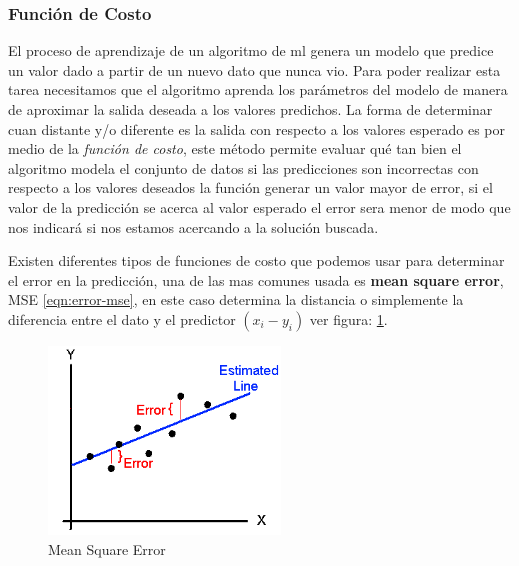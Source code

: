\subsubsection{Función de Costo}\label{sub:funcion_costo}

El proceso de aprendizaje de un algoritmo de \ac{ml} genera un  modelo que predice un valor dado a partir de un nuevo dato que nunca vio. Para poder realizar esta tarea necesitamos que el algoritmo aprenda los parámetros del modelo de manera de aproximar la salida deseada a los valores predichos. La forma de determinar cuan distante y/o diferente es la salida con respecto a los valores esperado es por medio de la \textit{función de costo}, este método permite evaluar qué tan bien el algoritmo modela el conjunto de datos si las predicciones son incorrectas con respecto a los valores deseados la función generar un valor mayor de error, si el valor de la predicción se acerca al valor esperado el error sera menor de modo que nos indicará si nos estamos acercando a la solución buscada.

Existen diferentes tipos de funciones de costo que podemos usar para determinar el error en la predicción, una de las mas comunes usada es \textbf{mean square error}, MSE \ref{eqn:error-mse}, en este caso determina la distancia o simplemente la diferencia entre el dato y el predictor $(x_i - y_i) $ ver figura: \ref{Fig:mse}.



\begin{figure}[H] \centering
  \includegraphics[height=5cm,keepaspectratio=true,clip=true]{imagenes/MarcoTeorico/mse-cost.png}
  \caption{Mean Square Error }\label{Fig:mse}
\end{figure}

